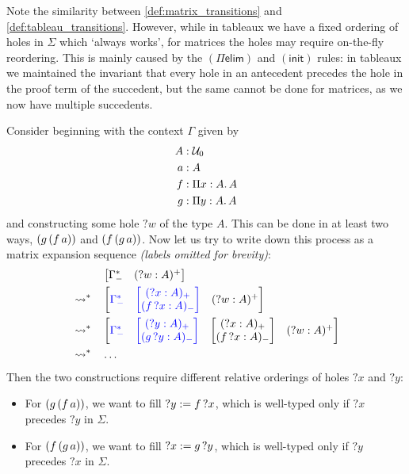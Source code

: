 \documentclass[twoside]{report}
\begin{document}
Note the similarity between \cref{def:matrix_transitions} and \cref{def:tableau_transitions}. However, while in tableaux we have a fixed ordering of holes in $\Sigma$ which `always works', for matrices the holes may require on-the-fly reordering. This is mainly caused by the $(\Pi\mathsf{elim})$ and $(\mathsf{init})$ rules: in tableaux we maintained the invariant that every hole in an antecedent precedes the hole in the proof term of the succedent, but the same cannot be done for matrices, as we now have multiple succedents.

\begin{example}
Consider beginning with the context $\Gamma$ given by
$$
\begin{aligned}
A &: \mathcal U_0 \\
a &: A \\
f &: \Pi{x} : {A}.\,{A} \\
g &: \Pi{y} : {A}.\,{A} \\
\end{aligned}
$$
and constructing some hole ${?w}$ of the type $A$. This can be done in at least two ways, $({g}\,{({f}\,{a})})$ and $({f}\,{({g}\,{a})})$. Now let us try to write down this process as a matrix expansion sequence \emph{(labels omitted for brevity)}:
$$
\begin{aligned}
& && \begin{bmatrix}\Gamma^\ast_- & ({?w} : A)^+\end{bmatrix} \\
& \rightsquigarrow^\ast && \begin{bmatrix}\textcolor{blue}{\Gamma^\ast_-} & \textcolor{blue}{\begin{bmatrix}({?x} : A)_+ \\ ({f}\,{?x} : A)_-\end{bmatrix}} & ({?w} : A)^+\end{bmatrix} \\
& \rightsquigarrow^\ast && \begin{bmatrix}\textcolor{blue}{\Gamma^\ast_-} & \textcolor{blue}{\begin{bmatrix}({?y} : A)_+ \\ ({g}\,{?y} : A)_-\end{bmatrix}} & \begin{bmatrix}({?x} : A)_+ \\ ({f}\,{?x} : A)_-\end{bmatrix} & ({?w} : A)^+\end{bmatrix} \\
& \rightsquigarrow^\ast && \ldots \\
\end{aligned}
$$
Then the two constructions require different relative orderings of holes ${?x}$ and ${?y}$:
\begin{itemize}[noitemsep]
    \item For $({g}\,{({f}\,{a})})$, we want to fill ${?y} := {f}\,{?x}$, which is well-typed only if ${?x}$ precedes ${?y}$ in $\Sigma$.
    \item For $({f}\,{({g}\,{a})})$, we want to fill ${?x} := {g}\,{?y}$, which is well-typed only if ${?y}$ precedes ${?x}$ in $\Sigma$.
\end{itemize}
\end{example}
\end{document}

